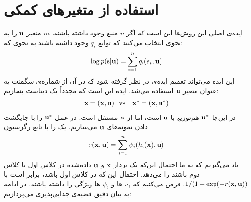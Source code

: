 \section{استفاده از متغیر‌های کمکی}

ایده‌ی اصلی این روش‌ها این است که اگر 
$n$
منبع وجود داشته باشند، $m$ متغیر 
$\mathbf{u}$
را به نحوی انتخاب می‌کنند که توابع 
$q_i$
وجود داشته باشند به نحوی که:
\begin{equation}
\log p(\mathbf{s}|\mathbf{u}) = \sum_{i = 1}^{n} q_i(s_i, \mathbf{u})
\label{genprior}
\end{equation}
این ایده‌ می‌تواند تعمیم ایده‌ی 
در نظر گرفته شود که در آن از شماره‌ی سگمنت به عنوان متعیر 
$\mathbf{u}$
استفاده می‌شد. ایده‌ این است که مجدداً یک دیتاست بسازیم:
\begin{align}
\tilde{\mathbf{x}}=(\mathbf{x},\mathbf{u})  \  \text{ vs. } \
\tilde{\mathbf{x}}^*=(\mathbf{x},\mathbf{u}^*) \label{xtildestar}
\end{align}
در این‌جا 
$\mathbf{u}^*$
هم‌توزیع با 
$\mathbf{u}$
است، اما از 
$\mathbf{x}$
مستقل است. در عمل 
$\mathbf{u}^*$
را با جایگشت دادن نمونه‌های 
$\mathbf{u}$
می‌سازیم. یک
را با تابع رگرسیون
\begin{equation} \label{reggen}
r(\mathbf{x},\mathbf{u})= \sum_{i=1}^n \psi_i(h_i(\mathbf{x}),\mathbf{u})
\end{equation}
یاد می‌گیریم که به ما احتمال این‌که یک بردار 
$\mathbf{x}$
و 
$\mathbf{u}$
داده‌شده  در کلاس اول یا کلاس دوم باشند را می‌دهد. احتمال این که در کلاس اول باشد، برابر است با
$1/(1+\exp(-r(\mathbf{x},\mathbf{u}))$.
فرض می‌کنیم که 
$h_i$
ها و 
$\psi_i$
ها ویژگی
را داشته باشند. در ادامه به بیان دقیق قضیه‌ی جدایی‌پذیری  می‌پردازیم:

